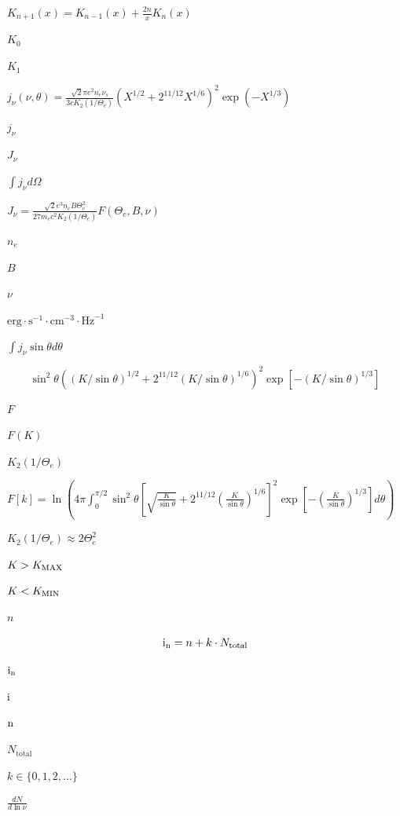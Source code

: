\documentclass{article}
\begin{document}
$ K_{n+1}(x) = K_{n-1}(x) + \frac{2n}{x}K_n(x) $
\pagebreak

$ K_0 $
\pagebreak

$ K_1 $
\pagebreak

$ j_\nu(\nu, \theta) = \frac{\sqrt{2}\pi e^2 n_e \nu_s}{3 c K_2(1/\Theta_e)} (X^{1/2} + 2^{11/12} X^{1/6})^2 \exp(-X^{1/3}) $
\pagebreak

$ j_\nu $
\pagebreak

$ J_\nu $
\pagebreak

$ \int j_\nu d\Omega $
\pagebreak

$ J_\nu = \frac{\sqrt{2} e^3 n_e B \Theta_e^2}{27 m_e c^2 K_2(1/\Theta_e)} F(\Theta_e, B, \nu) $
\pagebreak

$ n_e $
\pagebreak

$ B $
\pagebreak

$ \nu $
\pagebreak

$ \text{erg} \cdot \text{s}^{-1} \cdot \text{cm}^{-3} \cdot \text{Hz}^{-1} $
\pagebreak

$ \int j_\nu \sin\theta d\theta $
\pagebreak

\[ \sin^2\theta \left( (K/\sin\theta)^{1/2} + 2^{11/12}(K/\sin\theta)^{1/6} \right)^2 \exp\left[-(K/\sin\theta)^{1/3}\right] \]
\pagebreak

$ F $
\pagebreak

$ F(K) $
\pagebreak

$ K_2(1/\Theta_e) $
\pagebreak

$F[k] = \ln \left( 4\pi \int_{0}^{\pi/2} \sin^2\theta \left[ \sqrt{\frac{K}{\sin\theta}} + 2^{11/12} \left( \frac{K}{\sin\theta} \right)^{1/6} \right]^2 \exp\left[ -\left( \frac{K}{\sin\theta} \right)^{1/3} \right] d\theta \right)$
\pagebreak

$ K_2(1/\Theta_e) \approx 2 \Theta_e^2 $
\pagebreak

$ K > K_{\rm MAX} $
\pagebreak

$ K < K_{\rm MIN} $
\pagebreak

$ n $
\pagebreak

\[ {\rm i_n} = n + k \cdot N_{\text{total}}\]
\pagebreak

$ {\rm i_n}$
\pagebreak

$ \rm i $
\pagebreak

$ \rm n $
\pagebreak

$ N_{\text{total}} $
\pagebreak

$ k \in \{0, 1, 2, \dots\} $
\pagebreak

$ \frac{dN}{d\ln\nu} $
\pagebreak
\end{document}
